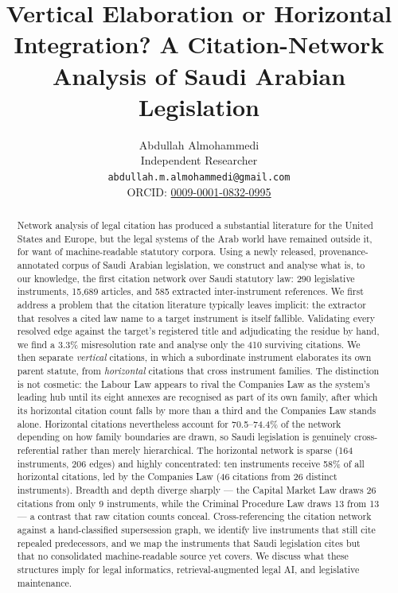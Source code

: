 \documentclass[sn-basic]{sn-jnl}%
\title{Vertical Elaboration or Horizontal Integration? A Citation-Network
Analysis of Saudi Arabian Legislation}
\author{}
\date{}
\author*[1]{\fnm{Abdullah} \sur{Almohammedi}}\email{abdullah.m.almohammedi@gmail.com}
\affil[1]{\orgname{Independent Researcher}}
\author{Abdullah Almohammedi \\
      Independent Researcher \\
      \texttt{abdullah.m.almohammedi@gmail.com} \\
      ORCID: \href{https://orcid.org/0009-0001-0832-0995}{0009-0001-0832-0995}}
\date{}
\begin{document}
\maketitle

\begin{abstract}
Network analysis of legal citation has produced a substantial literature for
the United States and Europe, but the legal systems of the Arab world have
remained outside it, for want of machine-readable statutory corpora. Using a
newly released, provenance-annotated corpus of Saudi Arabian legislation, we
construct and analyse what is, to our knowledge, the first citation
network over Saudi statutory law:
290 legislative instruments, 15{,}689 articles, and 585 extracted
inter-instrument references. We first address a problem that the citation
literature typically leaves implicit: the extractor that resolves a cited law
name to a target instrument is itself fallible. Validating every resolved
edge against the target's registered title and adjudicating the residue by
hand, we find a 3.3\% misresolution rate and analyse only the 410 surviving
citations. We then separate \emph{vertical} citations, in which a subordinate
instrument elaborates its own parent statute, from \emph{horizontal}
citations that cross instrument families. The distinction is not cosmetic:
the Labour Law appears to rival the Companies Law as the system's leading hub
until its eight annexes are recognised as part of its own family, after which
its horizontal citation count falls by more than a third and the Companies
Law stands alone. Horizontal citations nevertheless account for 70.5--74.4\%
of the network depending on how family boundaries are drawn, so Saudi
legislation is genuinely cross-referential rather than merely hierarchical.
The horizontal network is sparse (164 instruments, 206 edges) and highly
concentrated: ten instruments receive 58\% of all horizontal citations, led
by the Companies Law (46 citations from 26 distinct instruments). Breadth and
depth diverge sharply --- the Capital Market Law draws 26 citations from only
9 instruments, while the Criminal Procedure Law draws 13 from 13 --- a
contrast that raw citation counts conceal. Cross-referencing the citation
network against a hand-classified supersession graph, we identify live
instruments that still cite repealed predecessors, and we map the instruments
that Saudi legislation cites but that no consolidated machine-readable source
yet covers. We discuss what these structures imply for legal informatics,
retrieval-augmented legal AI, and legislative maintenance.
\end{abstract}
\end{document}
